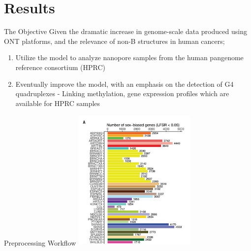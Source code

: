 \documentclass{beamer}
\begin{document}
	\section{Results}
	
	\begin{frame}{The Objective}
		Given the dramatic increase in genome-scale data produced using ONT platforms, and the relevance of non-B structures in human cancers; \newline
		\begin{enumerate}
			\item Utilize the model to analyze nanopore samples from the human pangenome reference consortium (HPRC)
			\item Eventually improve the model, with an emphasis on the detection of G4 quadruplexes - Linking methylation, gene expression profiles which are available for HPRC samples\newline
		\end{enumerate}
	\end{frame}

	\begin{frame}{Preprocessing Workflow}
		\centering
		\includegraphics[width=6cm,height=7cm]{sex.png}
	\end{frame}
\end{document}

